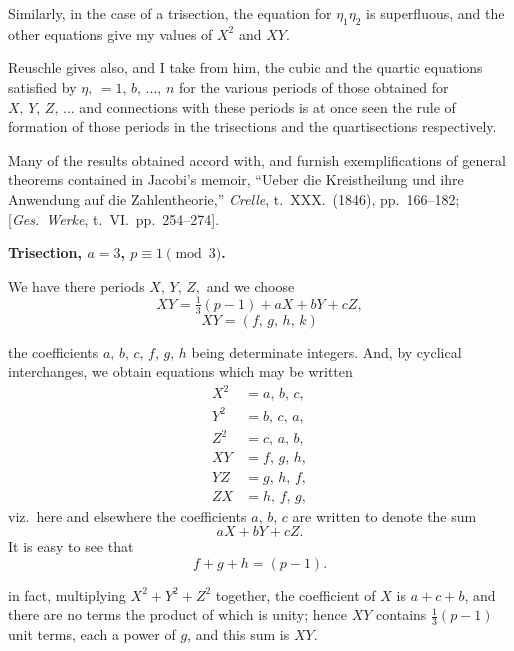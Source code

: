 \documentclass[11pt]{article}
\begin{document}
\medskip

\noindent
Similarly, in the case of a trisection, the equation for $\eta_1 \eta_2$ is superfluous, and the
other equations give my values of $X^2$ and $XY$.

\medskip

\noindent
Reuschle gives also, and I take from him, the cubic and the quartic equations
satisfied by $\eta,\, =1,\, b,\, ...,\, n$ for the various periods of those obtained for $X,\,Y,\,Z,\,...$
and connections with these periods is at once seen the rule of formation of those periods in
the trisections and the quartisections respectively.

\medskip

\noindent
Many of the results obtained accord with, and furnish exemplifications of general
theorems contained in Jacobi's memoir, ``Ueber die Kreistheilung und ihre Anwendung
auf die Zahlentheorie,'' \textit{Crelle}, t.~XXX.\ (1846), pp.~166--182; [\textit{Ges.\ Werke}, t.~VI.\ pp.~254--274].

\bigskip

\begin{center}\textbf{Trisection, $a = 3$, $p \equiv 1 \pmod 3$.}\end{center}

\medskip

\noindent
We have there periods $X,\,Y,\,Z,$ and we choose
\[
XY = \tfrac{1}{3}(p - 1) + aX + bY + cZ,
\]
\[
XY = (f,\,g,\,h,\,k)
\]

\noindent
the coefficients $a,\,b,\,c,\,f,\,g,\,h$ being determinate integers. And, by cyclical interchanges, we obtain equations which may be written
\begin{align*}
X^2 &= a,\,b,\,c,\\
Y^2 &= b,\,c,\,a,\\
Z^2 &= c,\,a,\,b,\\
XY &= f,\,g,\,h,\\
YZ &= g,\,h,\,f,\\
ZX &= h,\,f,\,g,
\end{align*}
viz.\ here and elsewhere the coefficients $a,\,b,\,c$ are written to denote the sum
\[
aX + bY + cZ.
\]
It is easy to see that
\[
f + g + h = (p - 1).
\]

\newpage

\noindent
in fact, multiplying $X^2 + Y^2 + Z^2$ together, the coefficient of $X$ is $a + c + b$, and there
are no terms the product of which is unity; hence $XY$ contains $\frac{1}{3}(p - 1)$ unit terms,
each a power of $g$, and this sum is $XY$.
\end{document}
